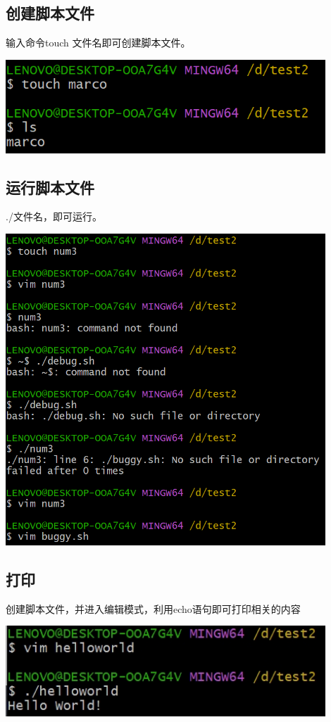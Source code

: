 \documentclass[UTF8,a4paper]{ctexart}
\begin{document}
\begin{sloppypar}
	\subsection{创建脚本文件}
	输入命令touch 文件名即可创建脚本文件。

	\includegraphics[width = 12cm]{17}

	\subsection{运行脚本文件}
	./文件名，即可运行。

	\includegraphics[width = 12cm]{18}
	
	\subsection{打印}
	创建脚本文件，并进入编辑模式，利用echo语句即可打印相关的内容
	
	\includegraphics[width = 12cm]{19}
	

\end{sloppypar}
\end{document}

